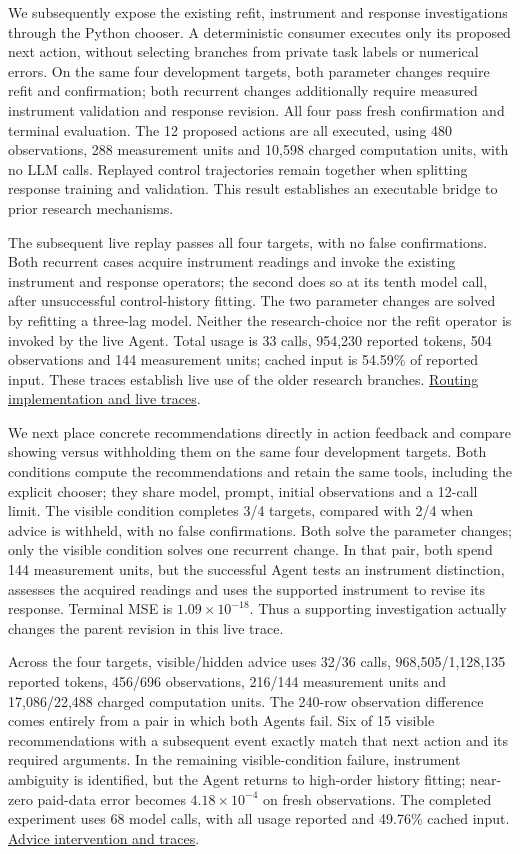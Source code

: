 \documentclass[11pt,a4paper]{article}
\begin{document}
We subsequently expose the existing refit, instrument and response investigations
through the Python chooser. A deterministic consumer executes only its proposed
next action, without selecting branches from private task labels or numerical
errors. On the same four development targets, both parameter changes require
refit and confirmation; both recurrent changes additionally require measured
instrument validation and response revision. All four pass fresh confirmation
and terminal evaluation. The 12 proposed actions are all executed, using 480
observations, 288 measurement units and 10,598 charged computation units, with
no LLM calls. Replayed control trajectories remain together when splitting
response training and validation. This result establishes an executable bridge
to prior research mechanisms.


The subsequent live replay passes all four targets, with no false confirmations.
Both recurrent cases acquire instrument readings and invoke the existing
instrument and response operators; the second does so at its tenth model call,
after unsuccessful control-history fitting. The two parameter changes are solved
by refitting a three-lag model. Neither the research-choice nor the refit operator
is invoked by the live Agent. Total usage is 33 calls, 954,230 reported tokens,
504 observations and 144 measurement units; cached input is 54.59\% of reported
input. These traces establish live use of the older research branches.
\hyperlink{artifact-82}{Routing implementation and live traces}.


We next place concrete recommendations directly in action feedback and compare
showing versus withholding them on the same four development targets. Both
conditions compute the recommendations and retain the same tools, including the
explicit chooser; they share model, prompt, initial observations and a 12-call
limit. The visible condition completes 3/4 targets, compared with 2/4 when advice
is withheld, with no false confirmations. Both solve the parameter changes;
only the visible condition solves one recurrent change. In that pair, both
spend 144 measurement units, but the successful Agent tests an instrument
distinction, assesses the acquired readings and uses the supported instrument
to revise its response. Terminal MSE is \(1.09\times10^{-18}\). Thus a supporting
investigation actually changes the parent revision in this live trace.


Across the four targets, visible/hidden advice uses 32/36 calls,
968,505/1,128,135 reported tokens, 456/696 observations, 216/144 measurement units
and 17,086/22,488 charged computation units. The 240-row observation difference
comes entirely from a pair in which both Agents fail. Six of 15 visible
recommendations with a subsequent event exactly match that next action and its
required arguments. In the remaining visible-condition failure, instrument
ambiguity is identified, but the Agent returns to high-order history fitting;
near-zero paid-data error becomes \(4.18\times10^{-4}\) on fresh observations.
The completed experiment uses 68 model calls, with all usage reported and 49.76\%
cached input. \hyperlink{artifact-83}{Advice intervention and traces}.
\end{document}
